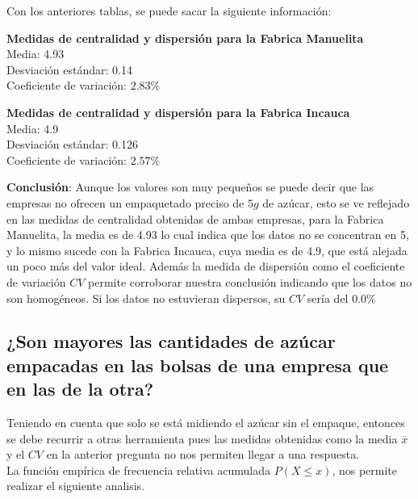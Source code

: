 \documentclass[12pt]{article}
\begin{document}
	Con los anteriores tablas, se puede sacar la siguiente información: \\
	\vspace{0.2cm}
	
	\textbf{{\large Medidas de centralidad y dispersión para la Fabrica Manuelita}}\\
	{\large Media:} 4.93 \\
	{\large Desviación estándar:} 0.14 \\
	{\large Coeficiente de variación}: $2.83\%$ \\
	\vspace{0.2cm}

	\textbf{{\large Medidas de centralidad y dispersión para la Fabrica Incauca}} \\
	{\large Media:} 4.9 \\
	{\large Desviación estándar:} 0.126 \\
	{\large Coeficiente de variación}: $2.57\%$ \\
	\vspace{0.2cm}
	
	{\large \textbf{Conclusión}}: 
	Aunque los valores son muy pequeños se puede decir que las empresas no ofrecen un empaquetado preciso de $5g$ de azúcar, esto se ve reflejado en las medidas de centralidad obtenidas de ambas empresas, para la Fabrica Manuelita, la media es de 4.93 lo cual indica que los datos no se concentran en 5, y lo mismo sucede con la Fabrica Incauca, cuya media es de 4.9, que está alejada un poco más del valor ideal. Además la medida de dispersión como el coeficiente de variación $CV$ permite corroborar nuestra conclusión indicando que los datos no son homogéneos. Si los datos no estuvieran dispersos, su  $CV$ sería del $0.0\%$
	
	\subsection{¿Son mayores las cantidades de azúcar empacadas en las bolsas de una empresa que en las de la otra? }
	Teniendo en cuenta que solo se está midiendo el azúcar sin el empaque, entonces se debe recurrir a otras herramienta pues las medidas obtenidas como la media $\overline{x}$ y el  $CV$ en la anterior pregunta no nos permiten llegar a una respuesta.\\
	
	La función empírica de frecuencia relativa acumulada $P(X\le x)$, nos permite realizar el siguiente analisis.
	\vspace{0.2cm}
	
\end{document}
